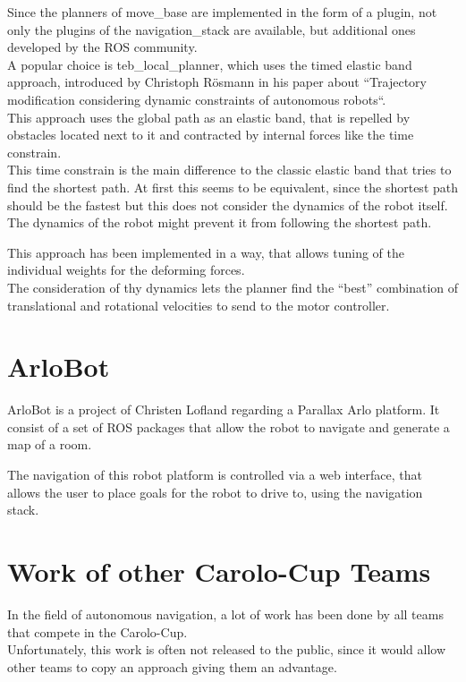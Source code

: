 Since the planners of move\_base are implemented in the form of a plugin, not only the plugins of the navigation\_stack are available, but additional ones developed by the ROS community.\\

A popular choice is teb\_local\_planner, which uses the timed elastic band approach, introduced by Christoph Rösmann in his paper about ``Trajectory modification considering dynamic constraints of autonomous robots``.\\
This approach uses the global path as an elastic band, that is repelled by obstacles located next to it and contracted by internal forces like the time constrain.\\
This time constrain is the main difference to the classic elastic band that tries to find the shortest path. At first this seems to be equivalent, since the shortest path should be the fastest but this does not consider the dynamics of the robot itself. 
The dynamics of the robot might prevent it from following the shortest path\cite{Rsmann2012TrajectoryMC}. 

This approach has been implemented in a way, that allows tuning of the individual weights for the deforming forces.\\

The consideration of thy dynamics lets the planner find the ``best'' combination of translational and rotational velocities to send to the motor controller.


\section{ArloBot}
ArloBot is a project of Christen Lofland regarding a Parallax Arlo platform. It consist of a set of ROS packages that allow the robot to navigate and generate a map of a room\cite{chrisl8}.

The navigation of this robot platform is controlled via a web interface, that allows the user to place goals for the robot to drive to, using the navigation stack.

\section{Work of other Carolo-Cup Teams}
In the field of autonomous navigation, a lot of work has been done by all teams that compete in the Carolo-Cup.\\

Unfortunately, this work is often not released to the public, since it would allow other teams to copy an approach giving them an advantage.\\

